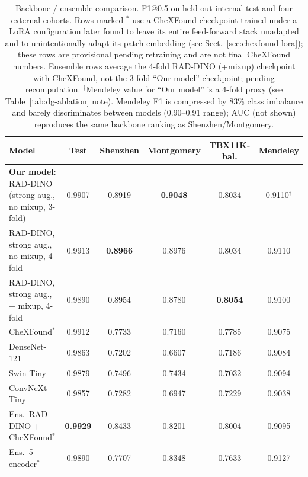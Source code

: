 \begin{table}[t]
\centering
\caption{Backbone / ensemble comparison. F1@0.5 on held-out internal test
and four external cohorts. Rows marked $^{*}$ use a CheXFound checkpoint
trained under a LoRA configuration later found to leave its entire
feed-forward stack unadapted and to unintentionally adapt its patch
embedding (see Sect.~\ref{sec:chexfound-lora}); these rows are provisional
pending retraining and are not final CheXFound numbers. Ensemble rows
average the 4-fold RAD-DINO (+mixup) checkpoint with CheXFound, not the
3-fold ``Our model'' checkpoint; pending recomputation. $^{\dagger}$Mendeley
value for ``Our model'' is a 4-fold proxy (see Table~\ref{tab:dg-ablation}
note). Mendeley F1 is compressed by 83\% class imbalance and barely
discriminates between models (0.90--0.91 range); AUC (not shown) reproduces
the same backbone ranking as Shenzhen/Montgomery.}
\label{tab:backbone-comparison}
\begin{tabular}{lccccc}
\toprule
Model & Test & Shenzhen & Montgomery & TBX11K-bal. & Mendeley \\
\midrule
\textbf{Our model}: RAD-DINO (strong aug., no mixup, 3-fold) & 0.9907 & 0.8919 & \textbf{0.9048} & 0.8034 & 0.9110$^{\dagger}$ \\
RAD-DINO, strong aug., no mixup, 4-fold & 0.9913 & \textbf{0.8966} & 0.8976 & 0.8034 & 0.9110 \\
RAD-DINO, strong aug., + mixup, 4-fold & 0.9890 & 0.8954 & 0.8780 & \textbf{0.8054} & 0.9100 \\
CheXFound$^{*}$                 & 0.9912 & 0.7733 & 0.7160 & 0.7785 & 0.9075 \\
DenseNet-121                    & 0.9863 & 0.7202 & 0.6607 & 0.7186 & 0.9084 \\
Swin-Tiny                       & 0.9879 & 0.7496 & 0.7434 & 0.7032 & 0.9094 \\
ConvNeXt-Tiny                   & 0.9857 & 0.7282 & 0.6947 & 0.7229 & 0.9038 \\
Ens.\ RAD-DINO + CheXFound$^{*}$ & \textbf{0.9929} & 0.8433 & 0.8201 & 0.8004 & 0.9095 \\
Ens.\ 5-encoder$^{*}$           & 0.9890 & 0.7707 & 0.8348 & 0.7633 & 0.9127 \\
\bottomrule
\end{tabular}
\end{table}
